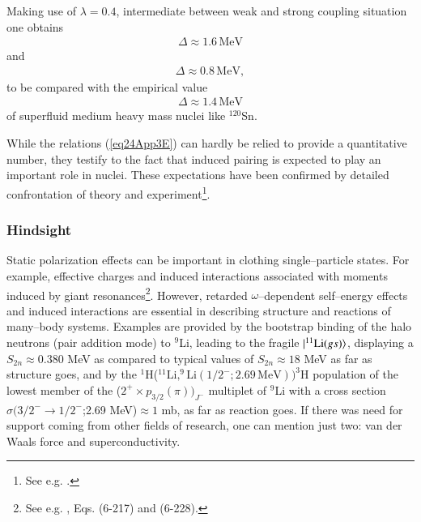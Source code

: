 \begin{subappendices}
Making use of $\lambda=0.4$, intermediate between weak and strong coupling situation one obtains
\begin{align}
\Delta\approx1.6\,\text{MeV}
\end{align}
and
\begin{align}
\Delta\approx0.8\,\text{MeV},
\end{align}
to be compared with the empirical value
\begin{align}
\Delta\approx1.4\,\text{MeV}
\end{align}
of superfluid medium heavy mass nuclei like $^{120}$Sn.

While the relations (\ref{eq24App3E}) can hardly be relied to provide a quantitative number, they testify to the fact that induced pairing is expected to play an important role in nuclei. These expectations have been confirmed by detailed confrontation of theory and experiment\footnote{See e.g. \cite{Idini:15}.}.
\subsubsection{Hindsight}
Static polarization effects can be important in clothing single--particle states. For example, effective charges  and induced interactions associated with moments induced by giant resonances\footnote{See e.g. \cite{Bohr:75}, Eqs. (6-217) and (6-228).}. However, retarded $\omega$--dependent self--energy effects and induced interactions are essential in describing structure and reactions of many--body systems. Examples are provided by the bootstrap binding of the halo neutrons (pair addition mode) to $^9$Li, leading to the fragile $|{^{11}\text{Li}(gs)} \rangle$, displaying a $S_{2n}\approx0.380$ MeV as compared to typical values of $S_{2n}\approx18$ MeV as far as structure goes, and by the $^1$H($^{11}\text{Li},^9\text{Li}(1/2^-;2.69\,\text{MeV}))^3$H population of the lowest member of the ($2^+\times p_{3/2}(\pi))_{J^-}$ multiplet of $^9$Li with a cross section $\sigma(3/2^-\to1/2^-$;2.69 MeV)$\approx 1$ mb, as far as reaction goes.
If there was need for support coming from other fields of research, one can mention just two: van der Waals force and superconductivity.



\end{subappendices}
